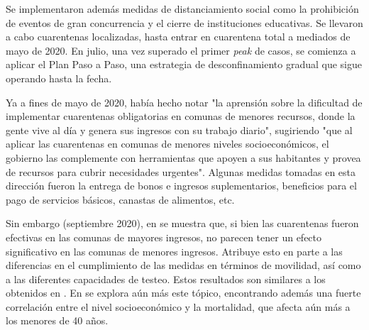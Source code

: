 Se implementaron además medidas de distanciamiento social como la prohibición de eventos de gran concurrencia y el cierre de instituciones educativas. Se llevaron a cabo cuarentenas localizadas, hasta entrar en cuarentena total a mediados de mayo de 2020. En julio, una vez superado el primer \textit{peak} de casos, se comienza a aplicar el Plan Paso a Paso, una estrategia de desconfinamiento  gradual que sigue operando hasta la fecha.

Ya a fines de mayo de 2020, \cite{Olivares2020} había hecho notar "la aprensión sobre la dificultad de implementar cuarentenas obligatorias en comunas de menores recursos, donde la gente vive al día y genera sus ingresos con su trabajo diario", sugiriendo "que al aplicar las cuarentenas en comunas de menores niveles socioeconómicos, el gobierno las complemente con herramientas que apoyen a sus habitantes y provea de recursos para cubrir necesidades urgentes". Algunas medidas tomadas en esta dirección fueron la entrega de bonos e ingresos suplementarios, beneficios para el pago de servicios básicos, canastas de alimentos, etc.

Sin embargo (septiembre 2020), en \cite{Bennett2021} se muestra que, si bien las cuarentenas fueron efectivas en las comunas de mayores ingresos, no parecen tener un efecto significativo en las comunas de menores ingresos. Atribuye esto en parte a las diferencias en el cumplimiento de las medidas en términos de movilidad, así como a las diferentes capacidades de testeo. Estos resultados son similares a los obtenidos en \cite{Gozzi2021}. En \cite{Mena2021} se explora aún más este tópico, encontrando además una fuerte correlación entre el nivel socioeconómico y la mortalidad, que afecta aún más a los menores de 40 años.



